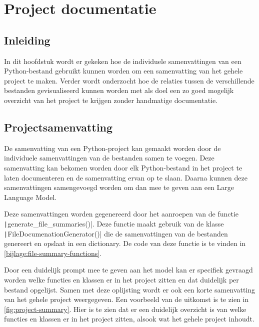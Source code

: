 
\section{Project documentatie}
\label{sec:project-documentatie}

\subsection{Inleiding}
\label{sec:project-documentatie-inleiding}

In dit hoofdstuk wordt er gekeken hoe de individuele samenvattingen van een Python-bestand gebruikt kunnen worden om een samenvatting van het gehele project te maken.
Verder wordt onderzocht hoe de relaties tussen de verschillende bestanden gevisualiseerd kunnen worden met als doel een zo goed mogelijk overzicht van het project te krijgen zonder handmatige documentatie.

\subsection{Projectsamenvatting}
\label{sec:project-documentatie-samenvatting}

De samenvatting van een Python-project kan gemaakt worden door de individuele samenvattingen van de bestanden samen te voegen.
Deze samenvatting kan bekomen worden door elk Python-bestand in het project te laten documenteren en de samenvatting ervan op te slaan.
Daarna kunnen deze samenvattingen samengevoegd worden om dan mee te geven aan een Large Language Model.

Deze samenvattingen worden gegenereerd door het aanroepen van de functie \texttt|generate_file_summaries()|. 
Deze functie maakt gebruik van de klasse \texttt|FileDocumenationGenerator()| die de samenvattingen van de bestanden genereert en opslaat in een dictionary.
De code van deze functie is te vinden in \ref{bijlage:file-summary-functions}.  

Door een duidelijk prompt mee te geven aan het model kan er specifiek gevraagd worden welke functies en klassen er in het project zitten en dat duidelijk per bestand opgelijst. 
Samen met deze oplijsting wordt er ook een korte samenvatting van het gehele project weergegeven.
Een voorbeeld van de uitkomst is te zien in \ref{fig:project-summary}.
Hier is te zien dat er een duidelijk overzicht is van welke functies en klassen er in het project zitten, alsook wat het gehele project inhoudt.

